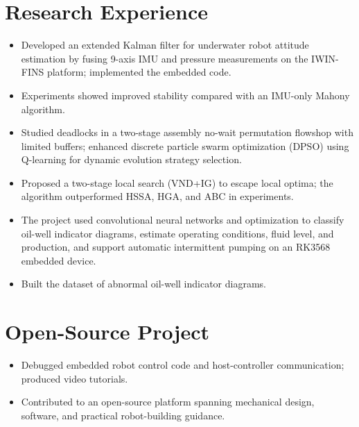 \documentclass[10pt,a4paper]{article}
\begin{document}
\section{Research Experience}
\begin{itemize}
  \item Developed an extended Kalman filter for underwater robot attitude estimation by fusing 9-axis IMU and pressure measurements on the IWIN-FINS platform; implemented the embedded code.
  \item Experiments showed improved stability compared with an IMU-only Mahony algorithm.
\end{itemize}
\begin{itemize}
  \item Studied deadlocks in a two-stage assembly no-wait permutation flowshop with limited buffers; enhanced discrete particle swarm optimization (DPSO) using Q-learning for dynamic evolution strategy selection.
  \item Proposed a two-stage local search (VND+IG) to escape local optima; the algorithm outperformed HSSA, HGA, and ABC in experiments.
\end{itemize}
\begin{itemize}
  \item The project used convolutional neural networks and optimization to classify oil-well indicator diagrams, estimate operating conditions, fluid level, and production, and support automatic intermittent pumping on an RK3568 embedded device.
  \item Built the dataset of abnormal oil-well indicator diagrams.
\end{itemize}

\newpage
\section{Open-Source Project}
\begin{itemize}
  \item Debugged embedded robot control code and host-controller communication; produced video tutorials.
  \item Contributed to an open-source platform spanning mechanical design, software, and practical robot-building guidance.
\end{itemize}
{\small{}\cvdivider{}}
\end{document}
